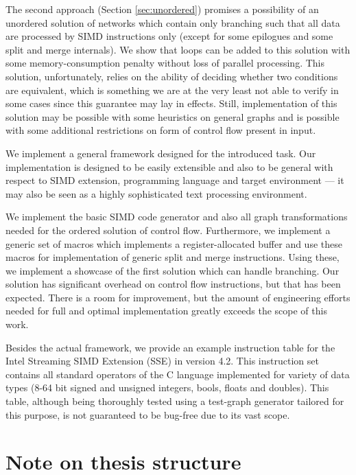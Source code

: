 The second approach (Section \ref{sec:unordered}) promises a possibility of an unordered solution of networks which contain only branching such that all data are processed by SIMD instructions only (except for some epilogues and some split and merge internals). We show that loops can be added to this solution with some memory-consumption penalty without loss of parallel processing. This solution, unfortunately, relies on the ability of deciding whether two conditions are equivalent, which is something we are at the very least not able to verify in some cases since this guarantee may lay in effects. Still, implementation of this solution may be possible with some heuristics on general graphs and is possible with some additional restrictions on form of control flow present in input.


  We implement a general framework designed for the introduced task. Our implementation is designed to be easily extensible and also to be general with respect to SIMD extension, programming language and target environment --- it may also be seen as a highly sophisticated text processing environment.  

We implement the basic SIMD code generator and also all graph transformations needed for the ordered solution of control flow. Furthermore, we implement a generic set of macros which implements a register-allocated buffer and use these macros for implementation of generic split and merge instructions. Using these, we implement a showcase of the first solution which can handle branching. Our solution has significant overhead on control flow instructions, but that has been expected. There is a room for improvement, but the amount of engineering efforts needed for full and optimal implementation greatly exceeds the scope of this work.
  
  Besides the actual framework, we provide an example instruction table for the Intel Streaming SIMD Extension (SSE) in version 4.2. This instruction set contains all standard operators of the C language implemented for variety of data types (8-64 bit signed and unsigned integers, bools, floats and doubles). This table, although being thoroughly tested using a test-graph generator tailored for this purpose, is not guaranteed to be bug-free due to its vast scope. 

\pagebreak

\section{Note on thesis structure}

